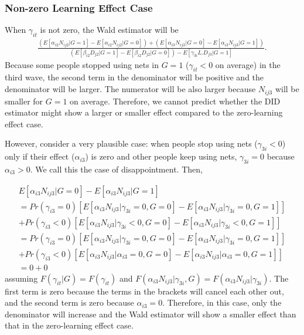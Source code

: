 \documentclass[fleqn,11pt]{article}
\begin{document}
\subsubsection{Non-zero Learning Effect Case}
When $\gamma_{it}$ is not zero, the Wald estimator will be 
\begin{gather}
\frac{\left( E[\alpha_{i2} N_{ij2}|G=1]   - E[\alpha_{i2}N_{ij2}|G=0]\right) +  \left(  E[\alpha_{i3}N_{ij3}|G=0] - E[\alpha_{i3} N_{ij3}|G=1]  \right)}{\left( E[\beta_{i2} D_{j2}|G=1]   - E[\beta_{i2}D_{j2}|G=0]\right)  - E[\gamma_{3i} L.D_{j3}|G=1]
}.
\end{gather}
Because some people stopped using nets in $G=1$ ($\gamma_{it}<0$ on average) in the third wave, the second term in the denominator will be positive and the denominator will be larger. The numerator will be also larger because  $N_{ij3}$ will be smaller for $G=1$ on average. Therefore, we cannot predict whether the DID estimator might show a larger or smaller effect compared to the zero-learning effect case. 

However, consider a very plausible case: when people stop using nets ($\gamma_{3i} < 0 $) only if their effect ($\alpha_{i3}$) is zero and other people keep using nets, $\gamma_{3i} = 0 $ because $\alpha_{i3}>0$. We call this the case of disappointment. Then,

\begin{gather*}
E[\alpha_{i3}N_{ij3}|G=0] - E[\alpha_{i3} N_{ij3}|G=1]  \\
 =  Pr(\gamma_{i3} =0 )\left[E[\alpha_{i3}N_{ij3}| \gamma_{3i} = 0, G=0] - E[\alpha_{i3} N_{ij3}|\gamma_{3i} = 0, G=1] \right] \\
 + Pr(\gamma_{i3} <0 )\left[E[\alpha_{i3}N_{ij3}| \gamma_{3i} < 0, G=0] - E[\alpha_{i3} N_{ij3}|\gamma_{3i} < 0, G=1] \right] \\
  =  Pr(\gamma_{i3} =0 )\left[E[\alpha_{i3}N_{ij3}| \gamma_{3i} = 0, G=0] - E[\alpha_{i3} N_{ij3}|\gamma_{3i} = 0, G=1] \right] \\
 + Pr(\gamma_{i3} <0 )\left[E[\alpha_{i3}N_{ij3}| \alpha_{i3} = 0, G=0] - E[\alpha_{i3} N_{ij3}|\alpha_{i3} = 0, G=1] \right] 
 \\ = 0 + 0 
\end{gather*}
assuming $F(\gamma_{it}|G) = F(\gamma_{it})$ and $F(\alpha_{i3}N_{ij3}|\gamma_{3i}, G) = F(\alpha_{i3}N_{ij3}|\gamma_{3i}) $. The first term is zero because the terms in the brackets will cancel each other out, and the second term is zero because $\alpha_{i3}=0$.
Therefore, in this case, only the denominator will increase and the Wald estimator will show a smaller effect than that in the zero-learning effect case.
\end{document}
